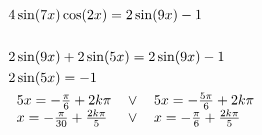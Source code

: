 \documentclass[preview,convert={density=300,outext=.png}]{standalone}
\begin{document}
\begin{align*}
    & 4\sin(7x)\cos(2x) = 2\sin(9x) - 1 \\
    & \\
    & 2\sin(9x) + 2\sin(5x) = 2\sin(9x) - 1 \\
    & 2\sin(5x) = -1 \\
    & \begin{tabular}{ l l l }
        $5x = -\frac{\pi}{6} + 2k\pi$ & $\vee$ & $5x = -\frac{5\pi}{6} + 2k\pi$ \\
        $x = -\frac{\pi}{30} + \frac{2k\pi}{5}$ & $\vee$ & $x = -\frac{\pi}{6} + \frac{2k\pi}{5}$ \\
    \end{tabular}
\end{align*}
\end{document}
